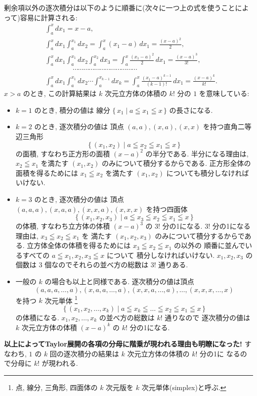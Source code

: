 \documentclass[12pt,twoside]{jarticle}
\theoremstyle{jplain}
\theoremstyle{jplain}
\theoremstyle{jplain}
\numberwithin{theorem}{section}
\numberwithin{equation}{section}
\numberwithin{figure}{section}
\numberwithin{table}{section}
\begin{document}
剰余項以外の逐次積分は以下のように順番に(次々に一つ上の式を使うことによって)容易に計算される:
\begin{align*}
&
\int_a^x\!\!\!dx_1 = x-a,
\\ &
\int_a^x\!\!\!dx_1\int_a^{x_1}\!\!\!dx_2
=\int_a^x (x_1-a)\,dx_1
=\frac{(x-a)^2}{2},
\\ &
\int_a^x\!\!\!dx_1\int_a^{x_1}\!\!\!dx_2\int_a^{x_2}\!\!\!dx_3
=\int_a^x\frac{(x_1-a)^2}{2}\,dx_1
=\frac{(x-a)^3}{3!},
\\ &
\qquad\qquad\cdots\cdots\cdots\cdots\cdots\cdots\cdots\cdots\cdots\cdots\cdots\cdots
\\ &
\int_a^x\!\!\!dx_1\int_a^{x_1}\!\!\!dx_2\cdots\!\!\int_a^{x_{k-1}}\!\!\!dx_k
=\int_a^x\frac{(x_1-a)^{k-1}}{(k-1)!}\,dx_1
=\frac{(x-a)^k}{k!}.
\end{align*}
$x>a$ のとき, この計算結果は $k$ 次元立方体の体積の $k!$ 分の $1$ を意味している:
\begin{itemize}
\item $k=1$ のとき, 積分の値は
線分 $\{\, x_1 \mid a\leqq x_1\leqq x\,\}$ の長さになる.

\item $k=2$ のとき, 逐次積分の値は
頂点 $(a,a),(x,a),(x,x)$ を持つ直角二等辺三角形 
\[
\{\,(x_1,x_2)\mid a\leqq x_2\leqq x_1\leqq x\,\}
\]
の面積, すなわち正方形の面積 $(x-a)^2$ の半分である.
半分になる理由は, $x_2\leqq x_1$ を満たす $(x_1,x_2)$ 
のみについて積分するからである. 正方形全体の面積を得るためには
$x_1\leqq x_2$ を満たす $(x_1,x_2)$ についても積分しなければいけない.

\item $k=3$ のとき, 逐次積分の値は
頂点 $(a,a,a),(x,a,a),(x,x,a),(x,x,x)$ を持つ四面体
\[
\{\,(x_1,x_2,x_3)\mid a\leqq x_3\leqq x_2\leqq x_1\leqq x\,\}
\]
の体積, すなわち立方体の体積 $(x-a)^3$ の $3!$ 分の1になる.
$3!$ 分の1になる理由は, $x_3\leqq x_2\leqq x_1$ を
満たす $(x_1,x_2,x_3)$ のみについて積分するからである.
立方体全体の体積を得るためには $x_3\leqq x_2\leqq x_1$ の以外の
順番に並んでいるすべての $a\leqq x_1,x_2,x_3\leqq x$ について
積分しなければいけない.  
$x_1,x_2,x_3$ の個数は $3$ 個なのでそれらの並べ方の総数は $3!$ 通りある.

\item 一般の $k$ の場合も以上と同様である.
逐次積分の値は頂点 
\[
(a,a,a,\ldots,a),(x,a,a,\ldots,a),(x,x,a,\ldots,a),\ldots,(x,x,x,\ldots,x)
\]
を持つ $k$ 次元単体%
\footnote{点, 線分, 三角形, 四面体の $k$ 次元版を $k$ 次元単体(simplex)と呼ぶ.}
\[
\{\,(x_1,x_2,\ldots,x_k)\mid a\leqq x_k\leqq\ldots\leqq x_2\leqq x_1\leqq x\,\}
\]
の体積になる.
$x_1,x_2,\ldots,x_k$ の並べ方の総数は $k!$ 通りなので
逐次積分の値は $k$ 次元立方体の体積 $(x-a)^k$ の $k!$ 分の1になる.
\end{itemize}
{\bf 以上によってTaylor展開の各項の分母に階乗が現われる理由も明瞭になった!}
すなわち, $1$ の $k$ 回の逐次積分の結果は $k$ 次元立方体の体積の $k!$ 分の1に
なるので分母に $k!$ が現われる.
\end{document}
